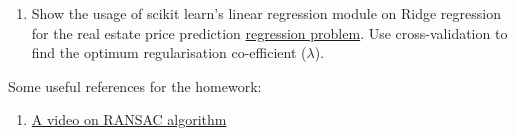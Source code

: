 \documentclass[colorlinks,linkcolor=true]{article}
\begin{document}
\begin{enumerate}
\item 	Show the usage of scikit learn's linear regression module on Ridge regression for the real estate price prediction \href{https://archive.ics.uci.edu/ml/datasets/Real+estate+valuation+data+set}{regression problem}.  Use cross-validation to find the optimum regularisation co-efficient ($\lambda$).




	
	

\end{enumerate}

Some useful references for the homework:

\begin{enumerate}
	\item \href{https://www.youtube.com/watch?v=BpOKB3OzQBQ}{A video on RANSAC algorithm}
\end{enumerate}
\end{document}
